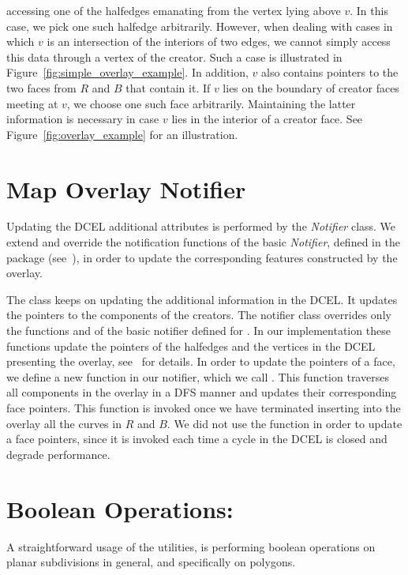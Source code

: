 \begin{itemize}
accessing one of the halfedges emanating from the vertex lying above 
$v$. In this case, we pick one such halfedge arbitrarily.
However, when dealing with cases in which $v$ is an intersection 
of the interiors of two edges, 
we cannot simply access this data through a vertex of the creator.
Such a case is illustrated in Figure~\ref{fig:simple_overlay_example}.
In addition, $v$ also contains pointers to the two 
faces from $R$ and $B$ that contain it. 
If $v$ lies on the boundary of creator faces meeting at $v$,
we choose one such face arbitrarily.
Maintaining the latter information is necessary 
in case $v$ lies in the interior of a creator face.
See Figure~\ref{fig:overlay_example} for an illustration.
\end{itemize}


\section{Map Overlay Notifier}
\label{sec:notifier}
Updating the DCEL additional attributes is performed by the {\em Notifier} class.
We extend and override the notification functions of the basic {\em Notifier}, 
defined in the  package 
(see~), 
in order to update the corresponding features constructed by the overlay. 

The  class 
keeps on updating the additional information in the DCEL.
It updates the pointers to the components of the creators.
The notifier class overrides only the functions  
and  of the basic notifier defined for .
In our implementation these functions update 
the pointers of the halfedges and the vertices in the DCEL 
presenting the overlay, see~ for details.
In order to update the pointers of a face, we define a new function in our 
notifier, which we call . 
This function traverses all components in the overlay in a DFS manner and 
updates their corresponding face pointers. 
This function is invoked once we have terminated 
inserting into the overlay all the curves in $R$ and $B$.
We did not use the  function in order to update a 
face pointers, since it is invoked each time a cycle in the DCEL 
is closed and degrade performance. 

\section{Boolean Operations:}
A straightforward usage of the  
utilities, is performing boolean operations on planar subdivisions in general, 
and specifically on polygons.

